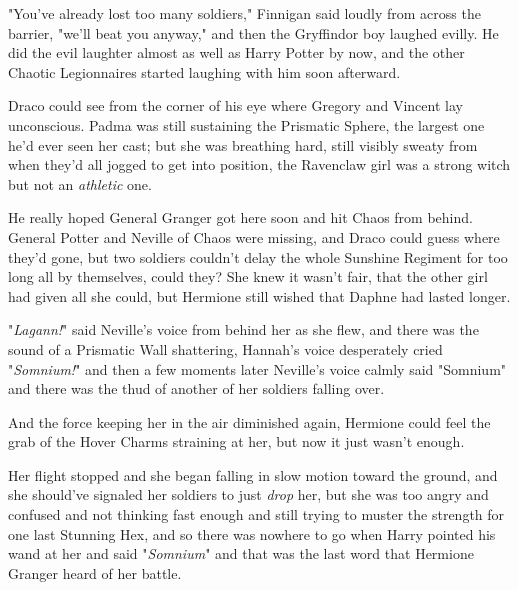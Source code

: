 "You've already lost too many soldiers," Finnigan said loudly from across the
barrier, "we'll beat you anyway," and then the Gryffindor boy laughed evilly.
He did the evil laughter almost as well as Harry Potter by now, and the other
Chaotic Legionnaires started laughing with him soon afterward.

Draco could see from the corner of his eye where Gregory and Vincent lay
unconscious. Padma was still sustaining the Prismatic Sphere, the largest one
he'd ever seen her cast; but she was breathing hard, still visibly sweaty from
when they'd all jogged to get into position, the Ravenclaw girl was a strong
witch but not an \emph{athletic} one.

He really hoped General Granger got here soon and hit Chaos from behind.
General Potter and Neville of Chaos were missing, and Draco could guess where
they'd gone, but two soldiers couldn't delay the whole Sunshine Regiment for
too long all by themselves, could they?
\later
She knew it wasn't fair, that the other girl had given all she could, but
Hermione still wished that Daphne had lasted longer.

"\emph{Lagann!}" said Neville's voice from behind her as she flew, and there
was the sound of a Prismatic Wall shattering, Hannah's voice desperately cried
"\emph{Somnium!}" and then a few moments later Neville's voice calmly said
"Somnium" and there was the thud of another of her soldiers falling over.

And the force keeping her in the air diminished again, Hermione could feel the
grab of the Hover Charms straining at her, but now it just wasn't enough.

Her flight stopped and she began falling in slow motion toward the ground, and
she should've signaled her soldiers to just \emph{drop} her, but she was too
angry and confused and not thinking fast enough and still trying to muster the
strength for one last Stunning Hex, and so there was nowhere to go when Harry
pointed his wand at her and said "\emph{Somnium}" and that was the last word
that Hermione Granger heard of her battle.
